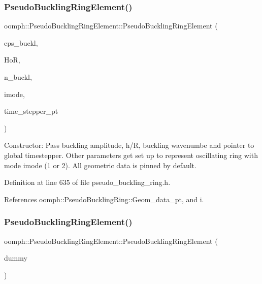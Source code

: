 \subsubsection{\texorpdfstring{Pseudo\+Buckling\+Ring\+Element()}{PseudoBucklingRingElement()}\hspace{0.1cm}{\footnotesize\ttfamily [2/3]}}
{\footnotesize\ttfamily oomph\+::\+Pseudo\+Buckling\+Ring\+Element\+::\+Pseudo\+Buckling\+Ring\+Element (\begin{DoxyParamCaption}\item[{const double \&}]{eps\+\_\+buckl,  }\item[{const double \&}]{HoR,  }\item[{const unsigned \&}]{n\+\_\+buckl,  }\item[{const unsigned \&}]{imode,  }\item[{\hyperlink{classoomph_1_1TimeStepper}{Time\+Stepper} $\ast$}]{time\+\_\+stepper\+\_\+pt }\end{DoxyParamCaption})\hspace{0.3cm}{\ttfamily [inline]}}



Constructor\+: Pass buckling amplitude, h/R, buckling wavenumbe and pointer to global timestepper. Other parameters get set up to represent oscillating ring with mode imode (1 or 2). All geometric data is pinned by default. 



Definition at line 635 of file pseudo\+\_\+buckling\+\_\+ring.\+h.



References oomph\+::\+Pseudo\+Buckling\+Ring\+::\+Geom\+\_\+data\+\_\+pt, and i.

\mbox{\label{classoomph_1_1PseudoBucklingRingElement_a7918aaec2b165086d527517c52525849}} 
\subsubsection{\texorpdfstring{Pseudo\+Buckling\+Ring\+Element()}{PseudoBucklingRingElement()}\hspace{0.1cm}{\footnotesize\ttfamily [3/3]}}
{\footnotesize\ttfamily oomph\+::\+Pseudo\+Buckling\+Ring\+Element\+::\+Pseudo\+Buckling\+Ring\+Element (\begin{DoxyParamCaption}\item[{const \hyperlink{classoomph_1_1PseudoBucklingRingElement}{Pseudo\+Buckling\+Ring\+Element} \&}]{dummy }\end{DoxyParamCaption})\hspace{0.3cm}{\ttfamily [inline]}}



